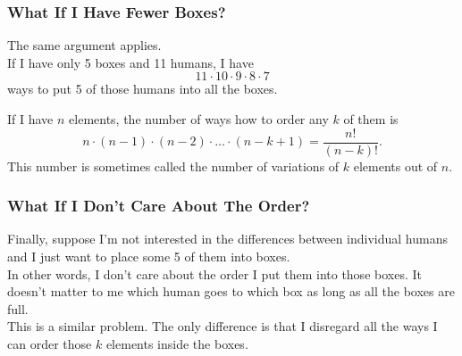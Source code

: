 \documentclass[aspectratio=169,11pt,usenames,dvipsnames]{beamer}
\begin{document}
\begin{frame}
\begin{center}
 \end{center}
\end{frame}

\begin{frame}
 \frametitle{What If I Have Fewer Boxes?}
 The same argument applies.\\ \pause
 If I have only 5 boxes and 11 humans, I have
 \[
  11 \cdot 10 \cdot 9 \cdot 8 \cdot 7
 \]
 ways to put 5 of those humans into all the boxes.\pause
 \begin{tcolorbox}[title=Variations]
  If I have $n$ elements, the number of ways how to order any $k$ of them is
  \[
   n \cdot (n-1) \cdot (n-2) \cdot \ldots \cdot (n-k+1) = \frac{n!}{(n-k)!}.
  \]
  This number is sometimes called the number of \alert{variations} of $k$
  elements out of $n$.
 \end{tcolorbox}
\end{frame}

\begin{frame}
 \frametitle{What If I Don't Care About The Order?}
 Finally, suppose I'm not interested in the differences between individual
 humans and I just want to place some 5 of them into boxes.\\ \pause
 In other words, I don't care about the order I put them into those boxes. It
 doesn't matter to me which human goes to which box as long as all the boxes are
 full.\\ \pause
 This is a similar problem. The only difference is that I disregard all the ways
 I can order those $k$ elements inside the boxes.
\end{frame}
\end{document}
